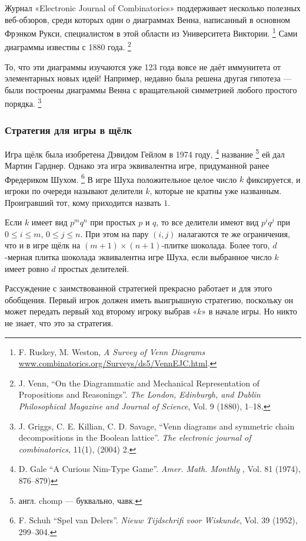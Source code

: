 {\sloppy

Журнал «Electronic Journal of Combinatorics» поддерживает несколько полезных веб-обзоров, среди которых один о диаграммах Венна, написанный в основном Фрэнком Рукси, специалистом в этой области из Университета Виктории.%
\footnote{F. Ruskey, M. Weston, \emph{A Survey of Venn Diagrams} \href{http://www.combinatorics.org/Surveys/ds5/VennEJC.html}{\url{www.combinatorics.org/Surveys/ds5/VennEJC.html}}.}
Сами диаграммы известны с 1880 года.%
\footnote{J. Venn,
``On the Diagrammatic and Mechanical Representation of Propositions and Reasonings''.
\emph{The London, Edinburgh, and Dublin Philosophical Magazine and Journal of Science}, Vol. 9 (1880),  1--18.}

}

То, что эти диаграммы изучаются уже 123 года вовсе не даёт иммунитета от элементарных новых идей!
Например, недавно была решена другая гипотеза --- были построены диаграммы Венна с вращательной симметрией любого простого порядка.%
\footnote{J. Griggs, C. E. Killian, C. D. Savage, ``Venn diagrams and symmetric chain decompositions in the Boolean lattice''.
\emph{The electronic journal of combinatorics}, 11(1), (2004)  2.}

\subsubsection*{Стратегия для игры в щёлк}

Игра щёлк была изобретена Дэвидом Гейлом в 1974 году,%
\footnote{D. Gale ``A Curious Nim-Type Game''. \emph{Amer. Math. Monthly }, Vol. 81 (1974), 876--879)}
 название%
\footnote{англ. chomp --- буквально, чавк.}
 ей дал Мартин Гарднер.
Однако эта игра эквивалентна игре, придуманной ранее Фредериком Шухом.%
\footnote{F. Schuh ``Spel van Delers''. \emph{Nieuw Tijdschrifi voor Wiskunde}, Vol. 39 (1952), 299--304.}
В игре Шуха положительное целое число $k$ фиксируется, и игроки по очереди называют делители $k$, которые не кратны уже названным.
Проигравший тот, кому приходится назвать $1$.

Если $k$ имеет вид $p^mq^n$ при простых $p$ и $q$, то все делители имеют вид $p^iq^j$ при $0 \le i \le m$, $0 \le j \le n$.
При этом на пару $(i,j)$ налагаются те же ограничения, что и в игре щёлк на $(m+1)\times(n+1)$-плитке шоколада.
Более того, $d$-мерная плитка шоколада эквивалентна игре Шуха, если выбранное число $k$ имеет ровно $d$ простых делителей.

Рассуждение с заимствованной стратегией прекрасно работает и для этого обобщения.
Первый игрок должен иметь выигрышную стратегию, поскольку он может передать первый ход второму игроку выбрав «$k$» в начале игры.
Но никто не знает, что это за стратегия.


